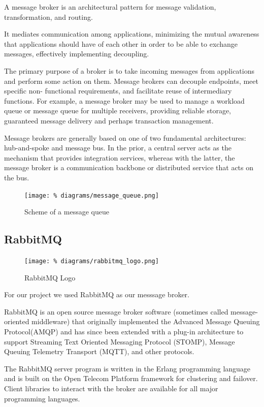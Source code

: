 A message broker is an architectural pattern for message
validation, transformation, and routing.

It mediates communication among applications, minimizing
the mutual awareness that applications should have of each
other in order to be able to exchange messages, effectively
implementing decoupling.\cite{amjad29}

The primary purpose of a broker is to take incoming
messages from applications and perform some action on them.
Message brokers can decouple endpoints, meet specific non-
functional requirements, and facilitate reuse of
intermediary functions. For example, a message broker may
be used to manage a workload queue or message queue for
multiple receivers, providing reliable storage, guaranteed
message delivery and perhaps transaction management.
\cite{amjad27}

Message brokers are generally based on one of two
fundamental architectures: hub-and-spoke and message bus.
In the prior, a central server acts as the mechanism that
provides integration services, whereas with the latter, the
message broker is a communication backbone or distributed
service that acts on the bus.\cite{amjad30}

\begin{figure}[H]
  \centering
  \texttt{[image: \%
    diagrams/message\_queue.png]}
  \caption{Scheme of a message queue}
\end{figure}

\subsection{RabbitMQ}
\label{s_rabbitmq}

\begin{figure}[H]
  \centering
  \texttt{[image: \%
    diagrams/rabbitmq\_logo.png]}
  \caption{RabbitMQ Logo}
\end{figure}

For our project we used RabbitMQ as our messsage broker.

RabbitMQ is an open source message broker software
(sometimes called message-oriented middleware) that
originally implemented the Advanced Message Queuing
Protocol(AMQP) and has since been extended with a plug-in
architecture to support Streaming Text Oriented Messaging
Protocol (STOMP), Message Queuing Telemetry Transport
(MQTT), and other protocols.\cite{amjad22}

The RabbitMQ server program is written in the Erlang
programming language and is built on the Open Telecom
Platform framework for clustering and failover. Client
libraries to interact with the broker are available for all
major programming languages.\cite{amjad23}

